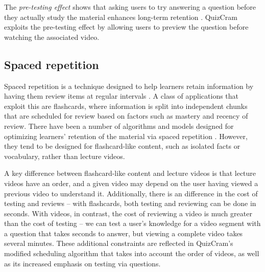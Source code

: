 \documentclass{sigchi}
\begin{document}
The \emph{pre-testing effect} shows that asking users to try answering a question before they actually study the material enhances long-term retention \cite{pretesting}. QuizCram exploits the pre-testing effect by allowing users to preview the question before watching the associated video.

\subsection{Spaced repetition}

Spaced repetition is a technique designed to help learners retain information by having them review  items at regular intervals \cite{karpicke2011spaced}. A class of applications that exploit this are flashcards, where information is split into independent chunks that are scheduled for review based on factors such as mastery and recency of review. There have been a number of algorithms and models designed for optimizing learners' retention of the material via spaced repetition \cite{optimalschedule}. However, they tend to be designed for flashcard-like content, such as isolated facts or vocabulary, rather than lecture videos. %

A key difference between flashcard-like content and lecture videos is that lecture videos have an order, and a given video may depend on the user having viewed a previous video to understand it. Additionally, there is an difference in the cost of testing and reviews -- with flashcards, both testing and reviewing can be done in seconds. With videos, in contrast, the cost of reviewing a video is much greater than the cost of testing -- we can test a user's knowledge for a video segment with a question that takes seconds to answer, but viewing a complete video takes several minutes. These additional constraints are reflected in QuizCram's modified scheduling algorithm that takes into account the order of videos, as well as its increased emphasis on testing via questions.


\end{document}
